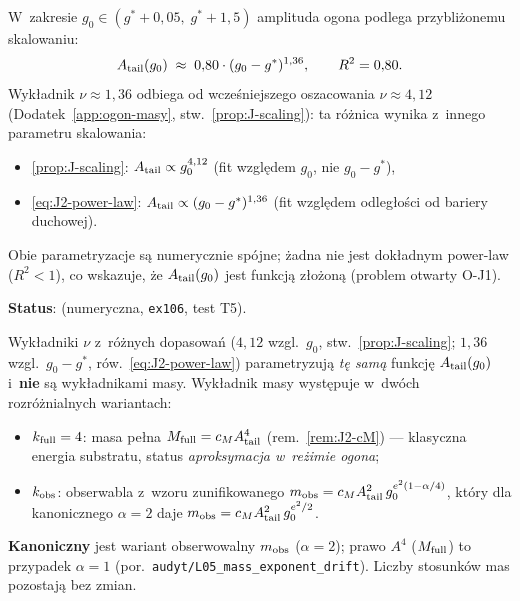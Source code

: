 \begin{proposition}\label{prop:J2-nu}
W~zakresie $g_0 \in (g^* + 0{,}05,\; g^* + 1{,}5)$ amplituda ogona
podlega przybli\.zonemu skalowaniu:
\begin{equation}\label{eq:J2-power-law}
  A_{\rm tail}(g_0) \;\approx\; 0{,}80 \cdot (g_0 - g^*)^{1{,}36},
  \qquad R^2 = 0{,}80.
\end{equation}
Wyk\l{}adnik $\nu \approx 1{,}36$ odbiega od wcze\'sniejszego oszacowania
$\nu \approx 4{,}12$ (Dodatek~\ref{app:ogon-masy}, stw.~\ref{prop:J-scaling}):
ta r\'o\.znica wynika z~innego parametru skalowania:
\begin{itemize}[nosep]
  \item \ref{prop:J-scaling}: $A_{\rm tail} \propto g_0^{4{,}12}$
    (fit wzgl\k{e}dem $g_0$, nie $g_0 - g^*$),
  \item \eqref{eq:J2-power-law}: $A_{\rm tail} \propto (g_0 - g^*)^{1{,}36}$
    (fit wzgl\k{e}dem odleg\l{}o\'sci od bariery duchowej).
\end{itemize}
Obie parametryzacje s\k{a} numerycznie sp\'ojne; \.zadna nie jest
dok\l{}adnym power-law ($R^2 < 1$), co wskazuje, \.ze
$A_{\rm tail}(g_0)$ jest funkcj\k{a} z\l{}o\.zon\k{a}
(problem otwarty O-J1).

\textbf{Status}:  (numeryczna, \texttt{ex106}, test T5).
\end{proposition}

\begin{remark}\label{rem:J2-kobs-kfull}
Wyk\l{}adniki $\nu$ z~r\'o\.znych dopasowa\'n ($4{,}12$ wzgl.\ $g_0$,
stw.~\ref{prop:J-scaling}; $1{,}36$ wzgl.\ $g_0-g^*$,
r\'ow.~\eqref{eq:J2-power-law}) parametryzuj\k{a} \emph{t\k{e} sam\k{a}}
funkcj\k{e} $A_{\rm tail}(g_0)$ i~\textbf{nie} s\k{a} wyk\l{}adnikami masy.
Wyk\l{}adnik masy wyst\k{e}puje w~dw\'och rozr\'o\.znialnych wariantach:
\begin{itemize}[nosep]
  \item $k_{\rm full}=4$: masa pe\l{}na $M_{\rm full}=c_M A_{\rm tail}^4$
    (rem.~\ref{rem:J2-cM}) --- klasyczna energia substratu, status
    \emph{aproksymacja w~re\.zimie ogona};
  \item $k_{\rm obs}$: obserwabla z~wzoru zunifikowanego
    $m_{\rm obs}=c_M A_{\rm tail}^2\,g_0^{e^2(1-\alpha/4)}$, kt\'ory dla
    kanonicznego $\alpha=2$ daje $m_{\rm obs}=c_M A_{\rm tail}^2
    \,g_0^{e^2/2}$.
\end{itemize}
\textbf{Kanoniczny} jest wariant obserwowalny $m_{\rm obs}$ ($\alpha=2$);
prawo $A^4$ ($M_{\rm full}$) to przypadek $\alpha=1$ (por.\
\texttt{audyt/L05\_mass\_exponent\_drift}). Liczby stosunk\'ow mas
pozostaj\k{a} bez zmian.
\end{remark}

